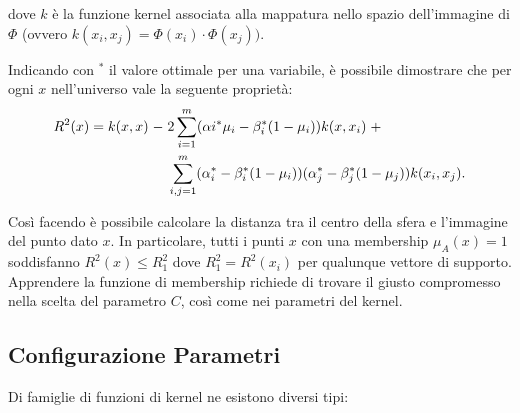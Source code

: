 \documentclass[a4paper,12pt]{report}
\begin{document}
\noindent dove $k$ è la funzione kernel associata alla mappatura nello spazio dell'immagine di $\Phi$ (ovvero $k(x_i,x_j) = \Phi(x_i)\cdot\Phi(x_j))$.

Indicando con $^*$ il valore ottimale per una variabile, è possibile dimostrare che per ogni $x$ nell'universo vale la seguente proprietà:
\begin{equation*}
\begin{split}
    R^{2}(x) = k(x,x) \hspace{0,1cm}- \hspace{0,1cm}&2\displaystyle\sum_{i=1}^{m}(\alpha{i}^{*}\mu_{i} - \beta_{i}^{*}(1-\mu_{i}))k(x,x_i)\hspace{0,1cm} + \\ 
    &\displaystyle\sum_{i,j=1}^{m}(\alpha_{i}^{*} - \beta_{i}^{*}(1-\mu_{i}))(\alpha_{j}^{*} - \beta_{j}^{*}(1-\mu_{j}))k(x_i,x_j).
\end{split}
\end{equation*}

\noindent Così facendo è possibile calcolare la distanza tra il centro della sfera e l'immagine del punto dato $x$.
In particolare, tutti i punti $x$ con una membership $\mu_{A}(x) = 1$ soddisfanno $R^2(x) \le R^2_1$ dove $R^2_1 = R^2(x_i)$ per qualunque vettore di supporto.
Apprendere la funzione di membership richiede di trovare il giusto compromesso nella scelta del parametro $C$, così come nei parametri del kernel.

\subsection*{Configurazione Parametri}

Di famiglie di funzioni di kernel ne esistono diversi tipi:
\end{document}
